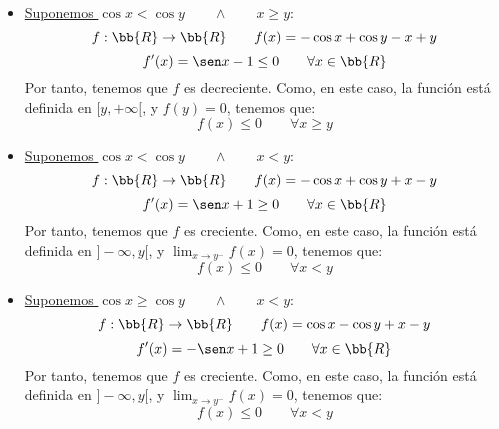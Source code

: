 \documentclass[12pt]{article}
\begin{document}
\begin{ejercicio}
\begin{itemize}
\begin{itemize}
        \item \underline{Suponemos $\cos x < \cos y \qquad \land \qquad x\geq y$}:
        \begin{equation*}
            f:\bb{R}\to \bb{R} \qquad f(x)=-\cos x + \cos y - x+y
        \end{equation*}
        \begin{equation*}
            f'(x) = \sen x -1 \leq 0 \qquad \forall x\in \bb{R}
        \end{equation*}
        Por tanto, tenemos que $f$ es decreciente. Como, en este caso, la función está definida en $[y,+\infty[$, y $f(y)=0$, tenemos que:
        \begin{equation*}
            f(x)\leq 0 \qquad \forall x\geq y
        \end{equation*}
    
        \item \underline{Suponemos $\cos x < \cos y \qquad \land \qquad x< y$}:
        \begin{equation*}
            f:\bb{R}\to \bb{R} \qquad f(x)=-\cos x + \cos y + x-y
        \end{equation*}
        \begin{equation*}
            f'(x) = \sen x +1 \geq 0 \qquad \forall x\in \bb{R}
        \end{equation*}
        Por tanto, tenemos que $f$ es creciente. Como, en este caso, la función está definida en $]-\infty, y[$, y $\lim_{x\to y^-}f(x)=0$, tenemos que:
        \begin{equation*}
            f(x)\leq 0 \qquad \forall x< y
        \end{equation*}
    
        \item \underline{Suponemos $\cos x \geq \cos y \qquad \land \qquad x< y$}:
        \begin{equation*}
            f:\bb{R}\to \bb{R} \qquad f(x)=\cos x - \cos y + x-y
        \end{equation*}
        \begin{equation*}
            f'(x) = -\sen x +1 \geq 0 \qquad \forall x\in \bb{R}
        \end{equation*}
        Por tanto, tenemos que $f$ es creciente. Como, en este caso, la función está definida en $]-\infty,y[$, y $\lim_{x\to y^-}f(x)=0$, tenemos que:
        \begin{equation*}
            f(x)\leq 0 \qquad \forall x< y
        \end{equation*}
    \end{itemize}
    

\end{itemize}
\end{ejercicio}
\end{document}
